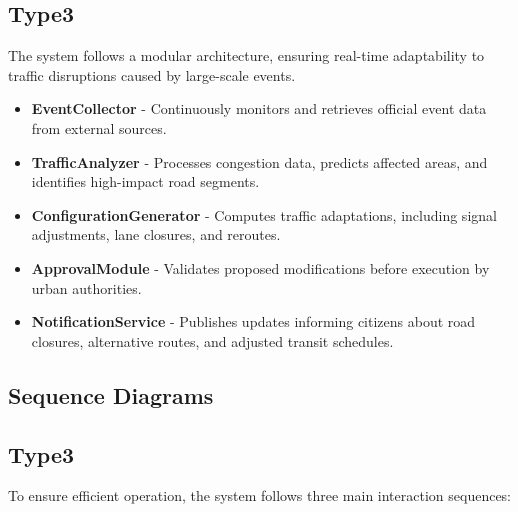 \documentclass[a4paper,12pt]{article}
\begin{document}
\subsection*{Type3}
The system follows a modular architecture, ensuring real-time adaptability to traffic disruptions caused by large-scale events.
\begin{itemize}
    \item \textbf{EventCollector} - Continuously monitors and retrieves official event data from external sources.
    \item \textbf{TrafficAnalyzer} - Processes congestion data, predicts affected areas, and identifies high-impact road segments.
    \item \textbf{ConfigurationGenerator} - Computes traffic adaptations, including signal adjustments, lane closures, and reroutes.
    \item \textbf{ApprovalModule} - Validates proposed modifications before execution by urban authorities.
    \item \textbf{NotificationService} - Publishes updates informing citizens about road closures, alternative routes, and adjusted transit schedules.
\end{itemize}

\newpage

\subsection{Sequence Diagrams}
\subsection*{Type3}
To ensure efficient operation, the system follows three main interaction sequences:
\end{document}
